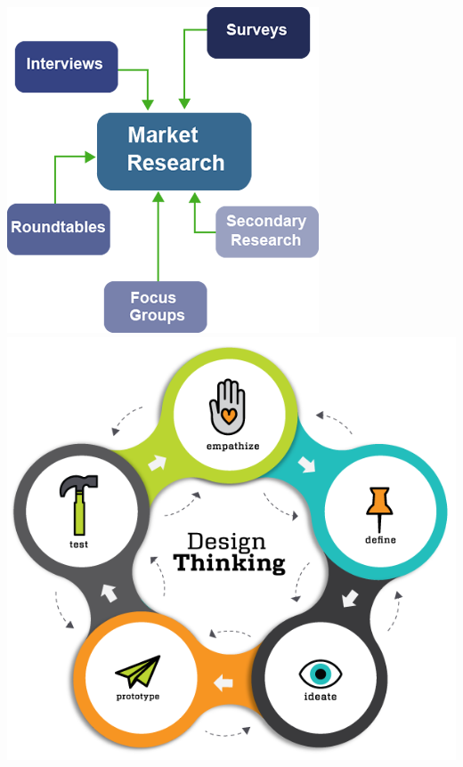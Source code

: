 \documentclass[final]{beamer}
\newlength{\onecolwid}
\begin{document}
\begin{frame}
\begin{columns}[t]
\begin{column}{\onecolwid}
\begin{exampleblock}{}
\centering
\vspace{1em}
\includegraphics[width=0.7\linewidth]{img/market-research.png}
\vspace{1em}
\includegraphics[scale=1]{img/design_thinking_visual.png}

\end{exampleblock}




\end{column}
\end{columns}
\end{frame}
\end{document}
